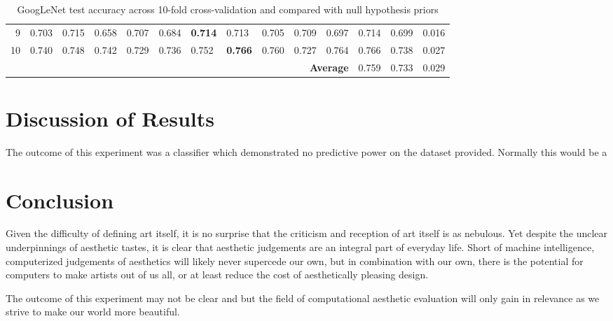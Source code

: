 \documentclass[midd]{thesis}
\begin{document}
\begin{table}[h]
{\begin{tabular}{@{}rlllllllllllll@{}}
\multicolumn{1}{r|}{9} & 0.703 & 0.715 & 0.658 & 0.707 & 0.684 & \textbf{0.714} & 0.713 & 0.705 & 0.709 & \multicolumn{1}{l|}{0.697} & 0.714 & 0.699 & 0.016 \\
\multicolumn{1}{r|}{10} & 0.740 & 0.748 & 0.742 & 0.729 & 0.736 & 0.752 & \textbf{0.766} & 0.760 & 0.727 & \multicolumn{1}{l|}{0.764} & 0.766 & 0.738 & 0.027 \\ \midrule
\multicolumn{1}{l}{\textbf{}} &  &  &  &  &  &  &  & \multicolumn{3}{r|}{\textbf{Average}} & 0.759 & 0.733 & 0.029 \\ \bottomrule
\end{tabular}
}
\caption{GoogLeNet test accuracy across 10-fold cross-validation and compared with null hypothesis priors}
\label{my-label}
\end{table}

\chapter{Discussion of Results}



The outcome of this experiment was a classifier which demonstrated no predictive power on the dataset provided. Normally this would be a


\chapter{Conclusion}






Given the difficulty of defining art itself, it is no surprise that the criticism and reception of art itself is as nebulous. Yet despite the unclear underpinnings of aesthetic tastes, it is clear that aesthetic judgements are an integral part of everyday life. Short of machine intelligence, computerized judgements of aesthetics will likely never supercede our own, but in combination with our own, there is the potential for computers to make artists out of us all, or at least reduce the cost of aesthetically pleasing design.

The outcome of this experiment may not be clear and but the field of computational aesthetic evaluation will only gain in relevance as we strive to make our world more beautiful.

\nocite{*}

\end{document}
